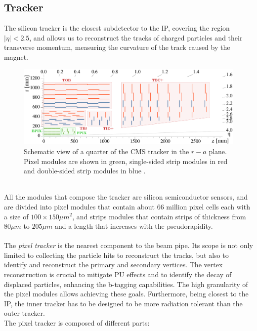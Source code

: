 \subsection{Tracker}
The silicon tracker \cite{CastaldiPatriceSiegristJean-EudesAugustin1997TheReport,CMS_pixel_Phase1_2012} is the closest subdetector to the IP, covering the region $|\eta|<2.5$, and allows us to reconstruct the tracks of charged particles and their transverse momentum, measuring the curvature of the track caused by the magnet.
\begin{figure}[h!]
    \centering
    \includegraphics[width=0.73\linewidth]{fig//chap03-cms/CMS_tracker_Phase1_edit.pdf}
    \caption{Schematic view of a quarter of the CMS tracker in the $r-a$ plane. Pixel modules are shown in green, single-sided strip modules in red and double-sided strip modules in blue \cite{DPGResultsTRKTWiki}.}
    \label{fig:cms_tracker}
\end{figure}
\\
All the modules that compose the tracker are silicon semiconductor sensors, and are divided into pixel modules that contain about 66 million pixel cells each with a size of $100 \times 150 \mu m^2$, and strips modules that contain strips of thickness from $80 \mu m$ to $205 \mu m$ and a length that increases with the pseudorapidity.\\
\\
The \emph{pixel tracker} \cite{Adam2021TheUpgrade} is the nearest component to the beam pipe. Its scope is not only limited to collecting the particle hits to reconstruct the tracks, but also to identify and reconstruct the primary and secondary vertices. The vertex reconstruction is crucial to mitigate PU effects and to identify the decay of displaced particles, enhancing the b-tagging capabilities.
The high granularity of the pixel modules allows achieving these goals. Furthermore, being closest to the IP, the inner tracker has to be designed to be more radiation tolerant than the outer tracker.\\
The pixel tracker is composed of different parts:
